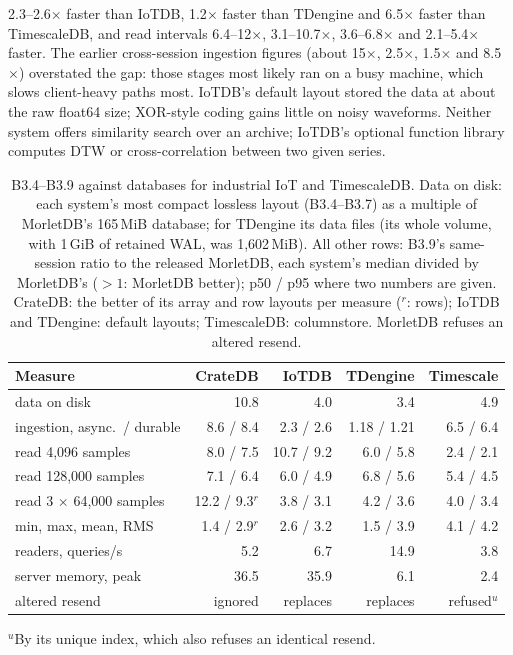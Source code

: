 \documentclass[sigconf,nonacm]{acmart}
\newcommand{\M}{MorletDB}
\begin{document}
2.3--2.6$\times$ faster than IoTDB, 1.2$\times$ faster than TDengine and 6.5$\times$ faster than TimescaleDB, and read intervals 6.4--12$\times$, 3.1--10.7$\times$, 3.6--6.8$\times$ and 2.1--5.4$\times$ faster. The earlier cross-session ingestion figures (about 15$\times$, 2.5$\times$, 1.5$\times$ and 8.5$\times$) overstated the gap: those stages most likely ran on a busy machine, which slows client-heavy paths most. IoTDB's default layout stored the data at about the raw float64 size; XOR-style coding gains little on noisy waveforms. Neither system offers similarity search over an archive; IoTDB's optional function library computes DTW or cross-correlation between two given series.

\begin{table}[t]
\caption{B3.4--B3.9 against databases for industrial IoT and TimescaleDB. Data on disk: each system's most compact lossless layout (B3.4--B3.7) as a multiple of \M{}'s 165\,MiB database; for TDengine its data files (its whole volume, with 1\,GiB of retained WAL, was 1,602\,MiB). All other rows: B3.9's same-session ratio to the released \M{}, each system's median divided by \M{}'s ($>1$: \M{} better); p50 / p95 where two numbers are given. CrateDB: the better of its array and row layouts per measure ($^r$: rows); IoTDB and TDengine: default layouts; TimescaleDB: columnstore. \M{} refuses an altered resend.}
\label{tab:b3iiot}
\small\setlength{\tabcolsep}{3pt}
\begin{tabularx}{\linewidth}{@{}>{\raggedright\arraybackslash}Xrrrr@{}}
\toprule
Measure & CrateDB & IoTDB & TDengine & Timescale \\
\midrule
data on disk & 10.8 & 4.0 & 3.4 & 4.9 \\
ingestion, async.\ / durable & 8.6 / 8.4 & 2.3 / 2.6 & 1.18 / 1.21 & 6.5 / 6.4 \\
read 4,096 samples & 8.0 / 7.5 & 10.7 / 9.2 & 6.0 / 5.8 & 2.4 / 2.1 \\
read 128,000 samples & 7.1 / 6.4 & 6.0 / 4.9 & 6.8 / 5.6 & 5.4 / 4.5 \\
read 3 $\times$ 64,000 samples & 12.2 / 9.3$^r$ & 3.8 / 3.1 & 4.2 / 3.6 & 4.0 / 3.4 \\
min, max, mean, RMS & 1.4 / 2.9$^r$ & 2.6 / 3.2 & 1.5 / 3.9 & 4.1 / 4.2 \\
4 readers, queries/s & 5.2 & 6.7 & 14.9 & 3.8 \\
server memory, peak & 36.5 & 35.9 & 6.1 & 2.4 \\
altered resend & ignored & replaces & replaces & refused$^u$ \\
\bottomrule
\end{tabularx}
\par\smallskip\footnotesize $^u$By its unique index, which also refuses an identical resend.
\end{table}
\end{document}
